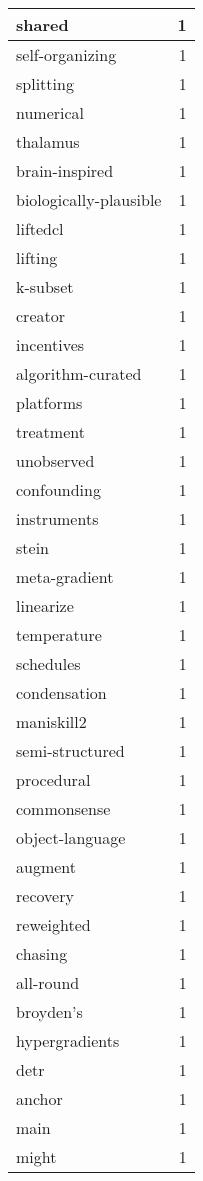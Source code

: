 \begin{table}[h]
\begin{tabular}{|l|r|}
\hline
shared & 1 \\
\hline
self-organizing & 1 \\
\hline
splitting & 1 \\
\hline
numerical & 1 \\
\hline
thalamus & 1 \\
\hline
brain-inspired & 1 \\
\hline
biologically-plausible & 1 \\
\hline
liftedcl & 1 \\
\hline
lifting & 1 \\
\hline
k-subset & 1 \\
\hline
creator & 1 \\
\hline
incentives & 1 \\
\hline
algorithm-curated & 1 \\
\hline
platforms & 1 \\
\hline
treatment & 1 \\
\hline
unobserved & 1 \\
\hline
confounding & 1 \\
\hline
instruments & 1 \\
\hline
stein & 1 \\
\hline
meta-gradient & 1 \\
\hline
linearize & 1 \\
\hline
temperature & 1 \\
\hline
schedules & 1 \\
\hline
condensation & 1 \\
\hline
maniskill2 & 1 \\
\hline
semi-structured & 1 \\
\hline
procedural & 1 \\
\hline
commonsense & 1 \\
\hline
object-language & 1 \\
\hline
augment & 1 \\
\hline
recovery & 1 \\
\hline
reweighted & 1 \\
\hline
chasing & 1 \\
\hline
all-round & 1 \\
\hline
broyden's & 1 \\
\hline
hypergradients & 1 \\
\hline
detr & 1 \\
\hline
anchor & 1 \\
\hline
main & 1 \\
\hline
might & 1 \\
\hline

\end{tabular}
\end{table}
